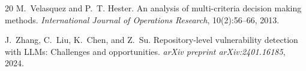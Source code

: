 \documentclass[10pt,twocolumn]{article}
\begin{document}
\begin{thebibliography}{20}
M.~Velasquez and P.~T. Hester.
\newblock An analysis of multi-criteria decision making methods.
\newblock \emph{International Journal of Operations Research}, 10(2):56--66, 2013.

J.~Zhang, C.~Liu, K.~Chen, and Z.~Su.
\newblock Repository-level vulnerability detection with LLMs: Challenges and opportunities.
\newblock \emph{arXiv preprint arXiv:2401.16185}, 2024.

\end{thebibliography}
\end{document}
